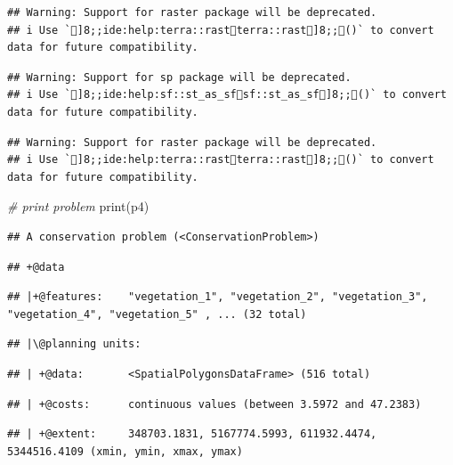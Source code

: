 \documentclass[
  12pt,
]{book}
\newenvironment{Shaded}{\begin{snugshade}}{\end{snugshade}}
\newcommand{\CommentTok}[1]{\textcolor[rgb]{0.56,0.35,0.01}{\textit{#1}}}
\newcommand{\FunctionTok}[1]{\textcolor[rgb]{0.00,0.00,0.00}{#1}}
\newcommand{\NormalTok}[1]{#1}
\begin{document}
\begin{verbatim}
## Warning: Support for raster package will be deprecated.
## i Use `]8;;ide:help:terra::rastterra::rast]8;;()` to convert data for future compatibility.
\end{verbatim}

\begin{verbatim}
## Warning: Support for sp package will be deprecated.
## i Use `]8;;ide:help:sf::st_as_sfsf::st_as_sf]8;;()` to convert data for future compatibility.
\end{verbatim}

\begin{verbatim}
## Warning: Support for raster package will be deprecated.
## i Use `]8;;ide:help:terra::rastterra::rast]8;;()` to convert data for future compatibility.
\end{verbatim}

\begin{Shaded}
\begin{Highlighting}[]
\CommentTok{\# print problem}
\FunctionTok{print}\NormalTok{(p4)}
\end{Highlighting}
\end{Shaded}

\begin{verbatim}
## A conservation problem (<ConservationProblem>)
\end{verbatim}

\begin{verbatim}
## +@data
\end{verbatim}

\begin{verbatim}
## |+@features:    "vegetation_1", "vegetation_2", "vegetation_3", "vegetation_4", "vegetation_5" , ... (32 total)
\end{verbatim}

\begin{verbatim}
## |\@planning units:
\end{verbatim}

\begin{verbatim}
## | +@data:       <SpatialPolygonsDataFrame> (516 total)
\end{verbatim}

\begin{verbatim}
## | +@costs:      continuous values (between 3.5972 and 47.2383)
\end{verbatim}

\begin{verbatim}
## | +@extent:     348703.1831, 5167774.5993, 611932.4474, 5344516.4109 (xmin, ymin, xmax, ymax)
\end{verbatim}
\end{document}
